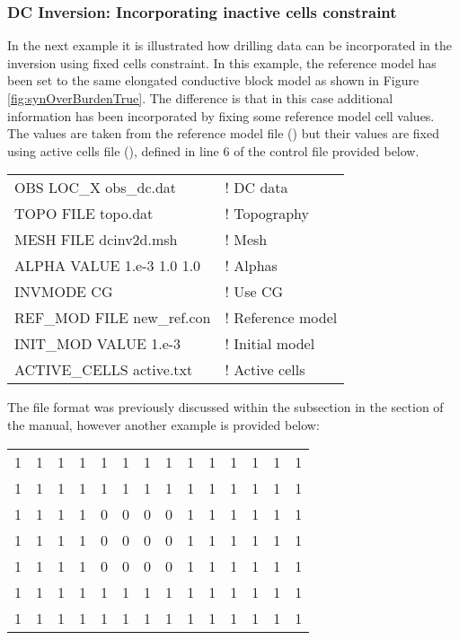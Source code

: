 \subsubsection{DC Inversion: Incorporating inactive cells constraint}
In the next example it is illustrated how drilling data can be incorporated in the inversion using fixed cells constraint. In this example, the reference model has been set to the same elongated conductive block model as shown in Figure \ref{fig:synOverBurdenTrue}. The difference is that in this case additional information has been incorporated by fixing some reference model cell values. The values are taken from the reference model file () but their values are fixed using active cells file (), defined in line 6 of the control file provided below.
%
\begin{fileExample}
\begin{tabular}{|ll|}
\hline
OBS LOC\_X obs\_dc.dat & ! DC data \\
TOPO FILE topo.dat & ! Topography\\
MESH FILE dcinv2d.msh & ! Mesh \\
ALPHA VALUE 1.e-3 1.0 1.0 & ! Alphas \\
INVMODE CG & ! Use CG \\
REF\_MOD FILE new\_ref.con & ! Reference model \\
INIT\_MOD VALUE 1.e-3 & ! Initial model \\
ACTIVE\_CELLS active.txt & ! Active cells \\
\hline
\end{tabular}
\end{fileExample}
%
The  file format was previously discussed within the  subsection in the  section of the manual, however another example is provided below:
%
\begin{fileExample}
\begin{tabular}{|cccccccccccccc|}
\hline
1 & 1 & 1 & 1 & 1 & 1 & 1 & 1 & 1 & 1 & 1 & 1 & 1 & 1 \\
1 & 1 & 1 & 1 & 1 & 1 & 1 & 1 & 1 & 1 & 1 & 1 & 1 & 1 \\
1 & 1 & 1 & 1 & 0 & 0 & 0 & 0 & 1 & 1 & 1 & 1 & 1 & 1 \\
1 & 1 & 1 & 1 & 0 & 0 & 0 & 0 & 1 & 1 & 1 & 1 & 1 & 1 \\
1 & 1 & 1 & 1 & 0 & 0 & 0 & 0 & 1 & 1 & 1 & 1 & 1 & 1 \\
1 & 1 & 1 & 1 & 1 & 1 & 1 & 1 & 1 & 1 & 1 & 1 & 1 & 1 \\
1 & 1 & 1 & 1 & 1 & 1 & 1 & 1 & 1 & 1 & 1 & 1 & 1 & 1 \\
\hline
\end{tabular}
\end{fileExample}
